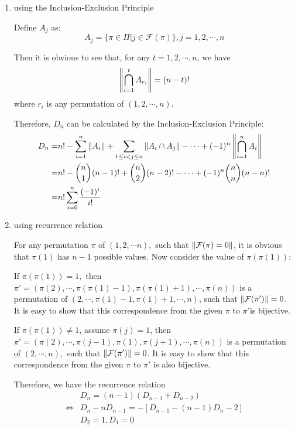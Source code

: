 \begin{enumerate}
    \item using the Inclusion-Exclusion Principle

      Define $ A_j$ as:
      \[ A_j =  \{ \pi \in \Pi | j \in \mathcal{F}(\pi)\}, j = 1,2,\cdots ,n\]

      Then it is obvious to see that, for any $ t = 1,2,\cdots ,n$, we have
      \[ \card{\bigcap_{i=1}^{t}A_{r_i}} = (n-t)!\]
      where $ r_i$ is any permutation of $ (1,2,\cdots ,n).$

      Therefore, $ D_n$ can be calculated by the Inclusion-Exclusion Principle:
       \begin{align*}
       D_n = & n! - \sum_{i=1}^n\card{A_i} + \sum_{1\le i< j\le n}{\card{A_i\cap A_j}}-\cdots +
      (-1)^n\card{\bigcap_{i=1}^n{A_i}}\\
      =& n! - {n\choose{1}}(n-1)! + {n\choose{2}}(n-2)!-\cdots +(-1)^n{n\choose{n}}(n-n)!\\
      =& n!\sum_{i=0}^n{\dfrac{(-1)^i}{i!}}
      \end{align*}

      \item using recurrence relation

     For any permutation $\pi$ of $ (1,2,\cdots n),$ such that $ \left\|\mathcal{F}(\pi) = 0\right\|$,
     it is obvious that $ \pi(1)$ has $ n-1$ possible values.
     Now consider the value of $ \pi(\pi(1)):$

     If $ \pi(\pi(1)) = 1, $ then $\pi'= (\pi(2),\cdots ,\pi(\pi(1)-1), \pi(\pi(1)+1), \cdots ,\pi(n))$
     is a permutation of
     $ (2,\cdots ,\pi(1)-1, \pi(1)+1, \cdots ,n)$, such that $\left\|\mathcal{F}(\pi')\right\| = 0$.
     It is easy to show that this correspondence from the given $ \pi$ to $ \pi'$is bijective.

     If $ \pi(\pi(1)) \neq 1$, assume $ \pi(j) = 1$, then $ \pi' =(\pi(2), \cdots ,\pi(j-1), \pi(1), \pi(j+1), \cdots ,\pi(n))$
     is a permutation of $ (2,\cdots ,n),$ such that $\left\|\mathcal{F}(\pi')\right\|=0$.
     It is easy to show that this correspondence from the given $\pi$ to $ \pi'$ is also bijective.

     Therefore, we have the recurrence relation
\begin{align}
& D_n = (n-1)(D_{n-1}+D_{n-2}) \nonumber\\
\Leftrightarrow & D_n - nD_{n-1} = - [D_{n-1}- (n-1)D_n-2] \label{eqn:recurrence}\\
&D_2 = 1, D_1 = 0 \nonumber
\end{align}


\end{enumerate}
